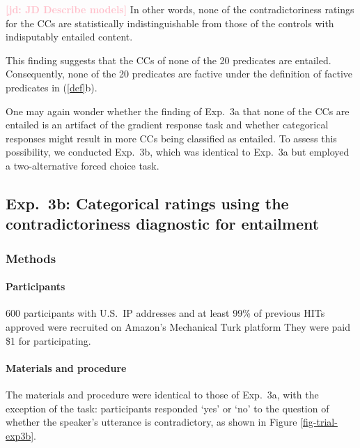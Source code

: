\documentclass[11pt,fleqn]{article}
\newcommand{\jd}[1]{\textbf{\textcolor{Pink}{[jd: #1]}}}
\newcommand{\6}{\mbox{$[\hspace*{-.6mm}[$}}
\newcommand{\9}{\mbox{$]\hspace*{-.6mm}]$}}
\begin{document}
{\jd{JD Describe models} In other words, none of the contradictoriness ratings for the CCs are statistically indistinguishable from those of the controls with indisputably entailed content. 

This finding suggests that the CCs of none of the 20 predicates are entailed. Consequently, none of the 20 predicates are factive under the definition of factive predicates in (\ref{def}b). 

One may again wonder whether the finding of Exp.~3a that none of the CCs are entailed is an artifact of the gradient response task and whether categorical responses might result in more CCs being classified as entailed. To assess this possibility, we conducted Exp.~3b, which was identical to Exp.~3a but employed a two-alternative forced choice task.



\subsection{Exp.~3b: Categorical ratings using the contradictoriness diagnostic for entailment}\label{s32}

\subsubsection{Methods}

\paragraph{Participants} 600 participants with U.S.\ IP addresses and at least 99\% of previous HITs approved were recruited on Amazon's Mechanical Turk platform They were paid \$1 for participating.

\paragraph{Materials and procedure} The materials and procedure were identical to those of Exp.~3a, with the exception of the task: participants responded `yes' or `no' to the question of whether the speaker's utterance is contradictory, as shown in Figure \ref{fig-trial-exp3b}.

}
\end{document}

